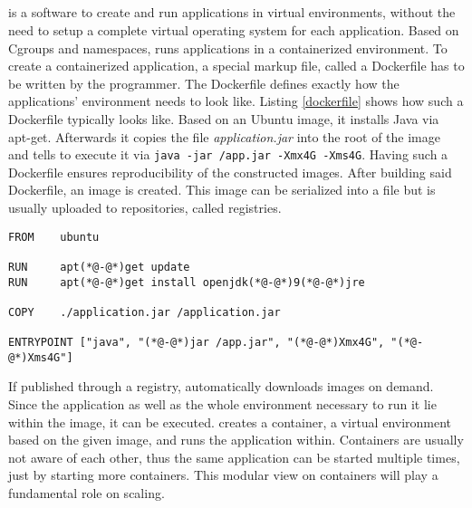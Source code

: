 
\subsection{\docker{}}
\docker{} is a software to create and run applications in virtual environments, without the need to setup a complete virtual operating system for each application. Based on Cgroups and namespaces, \docker{} runs applications in a containerized environment.
To create a containerized application, a special markup file, called a Dockerfile has to be written by the programmer. The Dockerfile defines exactly how the applications' environment needs to look like. Listing \ref{dockerfile} shows how such a Dockerfile typically looks like. Based on an Ubuntu image, it installs Java via apt-get. Afterwards it copies the file {\em{} application.jar} into the root of the image and tells \docker{} to execute it via \lstinline[]|java -jar /app.jar -Xmx4G -Xms4G|. Having such a Dockerfile ensures reproducibility of the constructed images. After building said Dockerfile, an image is created. This image can be serialized into a file but is usually uploaded to \docker{} repositories, called registries. 

\begin{minipage}{\textwidth}
	
\begin{lstlisting}[style=YAML,caption=A sample Dockerfile used for creating a simple Ubuntu based image to start a Java application.,label=dockerfile]
FROM	ubuntu

RUN		apt(*@-@*)get update
RUN		apt(*@-@*)get install openjdk(*@-@*)9(*@-@*)jre

COPY	./application.jar /application.jar

ENTRYPOINT ["java", "(*@-@*)jar /app.jar", "(*@-@*)Xmx4G", "(*@-@*)Xms4G"]
\end{lstlisting}

\end{minipage}

If published through a registry, \docker{} automatically downloads images on demand. Since the application as well as the whole environment necessary to run it lie within the image, it can be executed. \docker{} creates a container, a virtual environment based on the given image, and runs the application within. Containers are usually not aware of each other, thus the same application can be started multiple times, just by starting more containers. This modular view on containers will play a fundamental role on scaling.